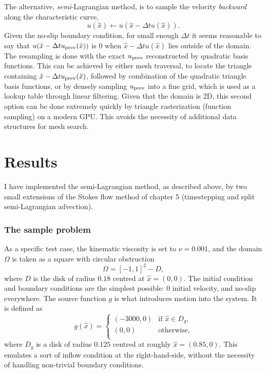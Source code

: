 The alternative, \textit{semi}-Lagrangian method, is to sample the velocity \textit{backward} along the characteristic curve,
    $$u(\hat{x}) \leftarrow u(\hat{x} - \Delta t u(\hat{x})).$$
Given the no-slip boundary condition, for small enough $\Delta t$ it seems reasonable to say that
$u(\hat{x} - \Delta t {u_{\text{prev}}}(\hat{x}))$ is $0$ when $\hat{x} - \Delta t u(\hat{x})$ lies outside of the domain.
The resampling is done with the exact ${u_{\text{prev}}}$ reconstructed by quadratic basis functions. This can be achieved by either mesh traversal, to locate the triangle
containing $\hat{x} - \Delta t {u_{\text{prev}}}(\hat{x})$, followed by combination of the quadratic triangle basis functions, or by densely sampling ${u_{\text{prev}}}$ into
a fine grid, which is used as a lookup table through linear filtering. Given that the domain is 2D, this second option can be done extremely quickly by triangle rasterization (function sampling) on a modern GPU. This avoids the necessity of additional data structures for mesh search.



\section{Results}
I have implemented the semi-Lagrangian method, as described above, by two small extensions
of the Stokes flow method of chapter 5
(timestepping and split semi-Lagrangian advection).
\subsubsection{The sample problem}
As a specific test case, the kinematic viscosity is set to $\nu = 0.001$, and
the domain $\Omega$ is taken as a square with circular obstruction
    $$\Omega = [-1,1]^2 - D,$$
where $D$ is the disk of radius $0.18$ centred at $\hat{x} = (0,0)$.
The initial condition and boundary conditions are the simplest possible: $0$ initial velocity, and no-slip everywhere.
The source function $g$ is what introduces motion into the system. It is defined as
$$
g(\hat{x}) = 
    \left\{\begin{array}{lr}
        (-3000, 0) &\text{if $\hat{x} \in D_g$},\\
        (0, 0) &\text{otherwise},\\
        \end{array}\right.
$$
where $D_g$ is a disk of radius $0.125$ centred at roughly $\hat{x} = (0.85, 0)$.
This emulates a sort of inflow condition at the right-hand-side, without the necessity of handling non-trivial boundary conditions.

